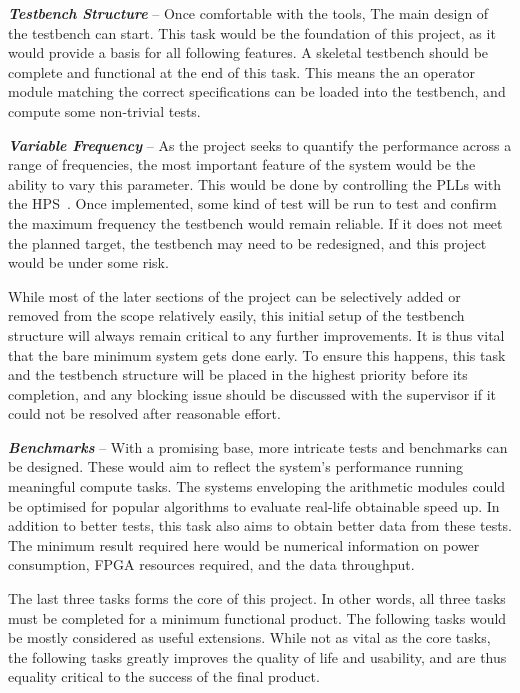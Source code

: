 \textit{\textbf{Testbench Structure}} --
Once comfortable with the tools, The main design of the testbench can start.
This task would be the foundation of this project, as it would provide a basis
for all following features.
A skeletal testbench should be complete and functional at the end of this
task.
This means the an operator module matching the correct specifications can
be loaded into the testbench, and compute some non-trivial tests.

\textit{\textbf{Variable Frequency}} --
As the project seeks to quantify the performance across a range of frequencies,
the most important feature of the system would be the ability to vary this
parameter.
This would be done by controlling the PLLs with the HPS~\cite{Altera4}.
Once implemented, some kind of test will be run to test and confirm the maximum
frequency the testbench would remain reliable.
If it does not meet the planned target, the testbench may need to be redesigned,
and this project would be under some risk.

While most of the later sections of the project can be selectively added or
removed from the scope relatively easily, this initial setup of the testbench
structure will always remain critical to any further improvements.
It is thus vital that the bare minimum system gets done early.
To ensure this happens, this task and the testbench structure will be placed in
the highest priority before its completion, and any blocking issue should be
discussed with the supervisor if it could not be resolved after reasonable
effort.

\textit{\textbf{Benchmarks}} --
With a promising base, more intricate tests and benchmarks can be designed.
These would aim to reflect the system's performance running meaningful compute
tasks.
The systems enveloping the arithmetic modules could be optimised for popular
algorithms to evaluate real-life obtainable speed up.
In addition to better tests, this task also aims to obtain better data from
these tests.
The minimum result required here would be numerical information on power
consumption, FPGA resources required, and the data throughput.

The last three tasks forms the core of this project.
In other words, all three tasks must be completed for a minimum functional
product.
The following tasks would be mostly considered as useful extensions.
While not as vital as the core tasks, the following tasks greatly improves the
quality of life and usability, and are thus equality critical to the success
of the final product.

